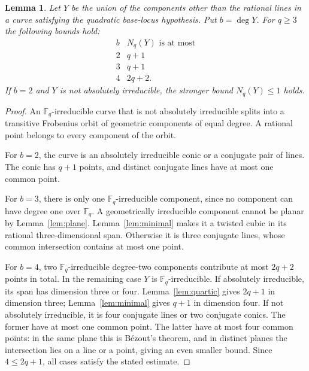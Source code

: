 \documentclass[11pt]{article}
\newtheorem{lemma}[theorem]{Lemma}
\theoremstyle{remark}\newtheorem{remark}[theorem]{Remark}
\newcommand{\F}{\mathbb F}
\newcommand{\Nq}{N_q}
\begin{document}
\begin{lemma}\label{lem:small}
Let $Y$ be the union of the components other than the rational lines in a curve satisfying the quadratic base-locus hypothesis. Put $b=\deg Y$. For $q\ge3$ the following bounds hold:
\[
\begin{array}{c|c}
b&\Nq(Y)\text{ is at most}\\ \hline
2&q+1\\
3&q+1\\
4&2q+2.
\end{array}
\]
If $b=2$ and $Y$ is not absolutely irreducible, the stronger bound $\Nq(Y)\le1$ holds.
\end{lemma}
\begin{proof}
An $\F_q$-irreducible curve that is not absolutely irreducible splits into a transitive Frobenius orbit of geometric components of equal degree. A rational point belongs to every component of the orbit.

For $b=2$, the curve is an absolutely irreducible conic or a conjugate pair of lines. The conic has $q+1$ points, and distinct conjugate lines have at most one common point.

For $b=3$, there is only one $\F_q$-irreducible component, since no component can have degree one over $\F_q$. A geometrically irreducible component cannot be planar by Lemma~\ref{lem:plane}. Lemma~\ref{lem:minimal} makes it a twisted cubic in its rational three-dimensional span. Otherwise it is three conjugate lines, whose common intersection contains at most one point.

For $b=4$, two $\F_q$-irreducible degree-two components contribute at most $2q+2$ points in total. In the remaining case $Y$ is $\F_q$-irreducible. If absolutely irreducible, its span has dimension three or four. Lemma~\ref{lem:quartic} gives $2q+1$ in dimension three; Lemma~\ref{lem:minimal} gives $q+1$ in dimension four. If not absolutely irreducible, it is four conjugate lines or two conjugate conics. The former have at most one common point. The latter have at most four common points: in the same plane this is B\'ezout's theorem, and in distinct planes the intersection lies on a line or a point, giving an even smaller bound. Since $4\le2q+1$, all cases satisfy the stated estimate.
\end{proof}
\end{document}
